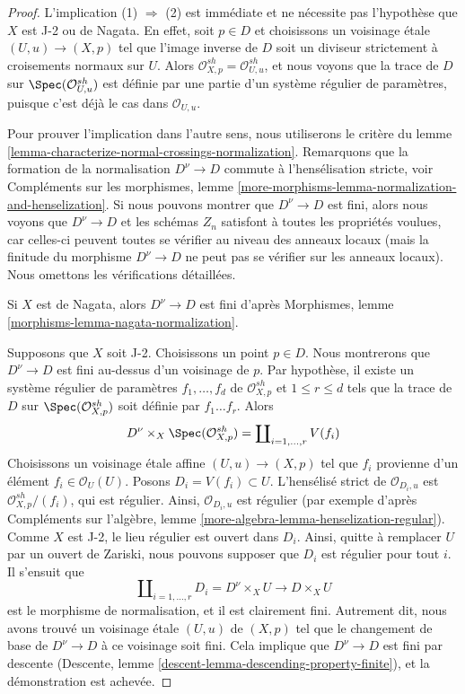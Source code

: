 \begin{proof}
L'implication (1) $\Rightarrow$ (2) est immédiate et
ne nécessite pas l'hypothèse que $X$ est J-2 ou de Nagata.
En effet, soit $p \in D$ et choisissons un voisinage \'etale
$(U, u) \to (X, p)$ tel que l'image inverse de $D$ soit
un diviseur strictement à croisements normaux sur $U$.
Alors $\mathcal{O}_{X, p}^{sh} = \mathcal{O}_{U, u}^{sh}$,
et nous voyons que la trace de $D$ sur $\Spec(\mathcal{O}_{U, u}^{sh})$
est définie par une partie d'un système régulier de paramètres,
puisque c'est déjà le cas dans $\mathcal{O}_{U, u}$.

\medskip\noindent
Pour prouver l'implication dans l'autre sens,
nous utiliserons le critère du
lemme \ref{lemma-characterize-normal-crossings-normalization}.
Remarquons que la formation de la normalisation $D^\nu \to D$
commute à l'hensélisation stricte, voir
Compléments sur les morphismes, lemme
\ref{more-morphisms-lemma-normalization-and-henselization}.
Si nous pouvons montrer que $D^\nu \to D$ est fini,
alors nous voyons que $D^\nu \to D$ et les schémas
$Z_n$ satisfont à toutes les propriétés voulues, car celles-ci
peuvent toutes se vérifier au niveau des anneaux locaux
(mais la finitude du morphisme $D^\nu \to D$
ne peut pas se vérifier sur les anneaux locaux).
Nous omettons les vérifications détaillées.

\medskip\noindent
Si $X$ est de Nagata, alors $D^\nu \to D$ est fini d'après
Morphismes, lemme \ref{morphisms-lemma-nagata-normalization}.

\medskip\noindent
Supposons que $X$ soit J-2. Choisissons un point $p \in D$. Nous montrerons
que $D^\nu \to D$ est fini au-dessus d'un voisinage de $p$.
Par hypothèse, il existe un système régulier de
paramètres $f_1, \ldots, f_d$ de $\mathcal{O}_{X, p}^{sh}$
et $1 \leq r \leq d$ tels que la trace de $D$ sur
$\Spec(\mathcal{O}_{X, p}^{sh})$ soit définie par $f_1 \ldots f_r$.
Alors
$$
D^\nu \times_X \Spec(\mathcal{O}_{X, p}^{sh}) = 
\coprod\nolimits_{i = 1, \ldots, r} V(f_i)
$$
Choisissons un voisinage \'etale affine
$(U, u) \to (X, p)$ tel que $f_i$ provienne d'un élément
$f_i \in \mathcal{O}_U(U)$. Posons $D_i = V(f_i) \subset U$.
L'hensélisé strict de $\mathcal{O}_{D_i, u}$
est $\mathcal{O}_{X, p}^{sh}/(f_i)$, qui est régulier.
Ainsi, $\mathcal{O}_{D_i, u}$ est régulier (par exemple d'après
Compléments sur l'algèbre, lemme \ref{more-algebra-lemma-henselization-regular}).
Comme $X$ est J-2, le lieu régulier est ouvert dans $D_i$.
Ainsi, quitte à remplacer $U$ par un ouvert de Zariski, nous pouvons supposer
que $D_i$ est régulier pour tout $i$. Il s'ensuit que
$$
\coprod\nolimits_{i = 1, \ldots, r} D_i = D^\nu \times_X U
\longrightarrow D \times_X U
$$
est le morphisme de normalisation, et il est clairement fini.
Autrement dit, nous avons trouvé
un voisinage \'etale $(U, u)$ de $(X, p)$ tel que
le changement de base de $D^\nu \to D$ à ce voisinage soit fini.
Cela implique que $D^\nu \to D$ est fini par descente
(Descente, lemme \ref{descent-lemma-descending-property-finite}),
et la démonstration est achevée.
\end{proof}













